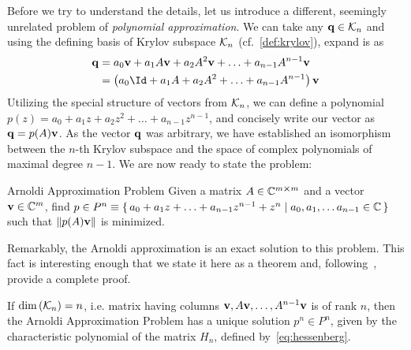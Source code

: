 Before we try to understand the details, let us introduce a different, seemingly unrelated problem of
\textit{polynomial approximation}. We can take any \(\vectorbold{q} \in \K{n}\) and using the
defining basis of Krylov subspace \(\mathcal{K}_{n}\) (cf.~\ref{def:krylov}), expand is as
\begin{align}
	\vectorbold{q} & = a_0 \vectorbold{v} + a_1 A \vectorbold{v} + a_2 A^2 \vectorbold{v} + \ldots + a_{n-1} A^{n-1} \vectorbold{v} \nonumber \\
	               & = \left(a_0\Id + a_1 A + a_2 A^2 + \ldots + a_{n-1} A^{n-1}\right) \vectorbold{v}
\end{align}
Utilizing the special structure of vectors from \(\mathcal{K}_{n}\), we can define a polynomial \(p(z) = a_0
+ a_1 z + a_2 z^2 + \ldots + a_{n-1}z^{n-1}\), and concisely write our vector as \(\vectorbold{q} = p(A)\vectorbold{v}\).
As the vector \(\vectorbold{q}\) was arbitrary, we have established an isomorphism between the \(n\)-th Krylov
subspace and the space of complex polynomials of maximal degree \(n-1\). We are now ready to state the problem:
\vspace{-0.3cm}
\begin{titled-frame}{Arnoldi Approximation Problem}
\centering
Given a matrix \(A\in\mathbb{C}^{m\cross m}\) and a vector \(\vectorbold{v}\in \CC^m\), find
\( p \in P^n \equiv \{\, a_0 + a_1 z + \ldots + a_{n-1} z^{n-1} + z^n \mid a_0,a_1,\ldots a_{n-1}\in \mathbb{C} \,\} \)\\
such that \(\norm{p(A)\vectorbold{v}}\) is minimized.
\end{titled-frame}
Remarkably, the Arnoldi approximation is an exact solution to this problem. This fact is interesting enough that
we state it here as a theorem and, following~\textcite{Trefethen1997}, provide a complete proof.

\begin{theorem}
	If \(\textrm{dim}\left(\mathcal{K}_{n}\right) = n\), i.e. matrix having columns \(\vectorbold{v},A\vectorbold{v},\ldots, A^{n-1}
	\vectorbold{v}\) is of rank \(n\), then the Arnoldi Approximation Problem has a unique solution \(p^n\in P^n\),
	given by the characteristic polynomial of the matrix \(H_n\), defined by~\eqref{eq:hessenberg}.
	\label{theorem:arnoldi_approximation}
\end{theorem}

